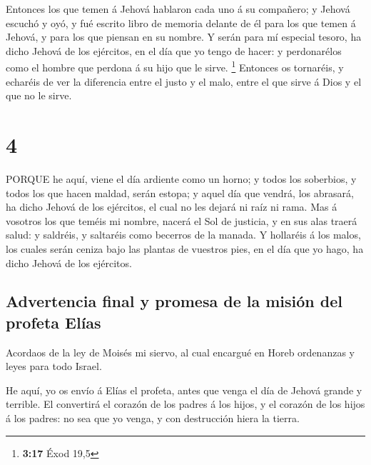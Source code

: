  Entonces los que temen á Jehová hablaron cada uno á su
compañero; y Jehová escuchó y oyó, y fué escrito libro de memoria
delante de él para los que temen á Jehová, y para los que piensan en su
nombre.  Y serán para mí especial tesoro, ha dicho Jehová
de los ejércitos, en el día que yo tengo de hacer: y perdonarélos como
el hombre que perdona á su hijo que le sirve. \footnote{\textbf{3:17}
  Éxod 19,5}  Entonces os tornaréis, y echaréis de ver la
diferencia entre el justo y el malo, entre el que sirve á Dios y el que
no le sirve.

\hypertarget{section-3}{%
\section{4}\label{section-3}}

 PORQUE he aquí, viene el día ardiente como un horno; y
todos los soberbios, y todos los que hacen maldad, serán estopa; y aquel
día que vendrá, los abrasará, ha dicho Jehová de los ejércitos, el cual
no les dejará ni raíz ni rama.  Mas á vosotros los que
teméis mi nombre, nacerá el Sol de justicia, y en sus alas traerá salud:
y saldréis, y saltaréis como becerros de la manada.  Y
hollaréis á los malos, los cuales serán ceniza bajo las plantas de
vuestros pies, en el día que yo hago, ha dicho Jehová de los ejércitos.

\hypertarget{advertencia-final-y-promesa-de-la-misiuxf3n-del-profeta-eluxedas}{%
\subsection{Advertencia final y promesa de la misión del profeta
Elías}\label{advertencia-final-y-promesa-de-la-misiuxf3n-del-profeta-eluxedas}}

 Acordaos de la ley de Moisés mi siervo, al cual encargué en
Horeb ordenanzas y leyes para todo Israel.

 He aquí, yo os envío á Elías el profeta, antes que venga el
día de Jehová grande y terrible.  El convertirá el corazón
de los padres á los hijos, y el corazón de los hijos á los padres: no
sea que yo venga, y con destrucción hiera la tierra.
